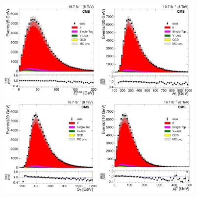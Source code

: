 \begin{figure}[hbtp]
    \centering
     \includegraphics[width=0.45\textwidth]{Chapters/04_Analysis/04b_XSections/images/control_plots/before_fit/8TeV/MuPlusJets_patType1CorrectedPFMet_2orMoreBtags_with_ratio.pdf}\hfill
     \includegraphics[width=0.45\textwidth]{Chapters/04_Analysis/04b_XSections/images/control_plots/before_fit/8TeV/MuPlusJets_HT_2orMoreBtags_with_ratio.pdf}\\
     \includegraphics[width=0.45\textwidth]{Chapters/04_Analysis/04b_XSections/images/control_plots/before_fit/8TeV/MuPlusJets_patType1CorrectedPFMet_ST_2orMoreBtags_with_ratio.pdf}\hfill
     \includegraphics[width=0.45\textwidth]{Chapters/04_Analysis/04b_XSections/images/control_plots/before_fit/8TeV/MuPlusJets_patType1CorrectedPFMet_WPT_2orMoreBtags_with_ratio.pdf}\\

\end{figure}
